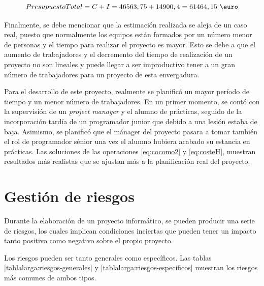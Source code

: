 \documentclass[pdftex,11pt,a4paper]{book}
\begin{document}
\vspace{-3mm}
\begin{equation}
Presupuesto Total = C + I = 46563,75 + 14900,4 = 61464,15 \textup{ \euro}
\label{eq:presupuesto-final}
\end{equation}

Finalmente, se debe mencionar que la estimación realizada se aleja de un caso real, puesto que normalmente los equipos están formados por un número menor de personas y el tiempo para realizar el proyecto es mayor. Esto se debe a que el aumento de trabajadores y el decremento del tiempo de realización de un proyecto no son lineales y puede llegar a ser improductivo tener a un gran número de trabajadores para un proyecto de esta envergadura.

Para el desarrollo de este proyecto, realmente se planificó un mayor período de tiempo y un menor número de trabajadores. En un primer momento, se contó con la supervisión de un \textit{project manager} y el alumno de prácticas, seguido de la incorporación tardía de un programador junior que debido a una lesión estaba de baja. Asimismo, se planificó que el mánager del proyecto pasara a tomar también el rol de programador sénior una vez el alumno hubiera acabado su estancia en prácticas. Las soluciones de las operaciones \ref{eq:cocomo2} y \ref{eq:costeH}, muestran resultados más realistas que se ajustan más a la planificación real del proyecto.

\section{Gestión de riesgos} \label{seccion:riesgos}

Durante la elaboración de un proyecto informático, se pueden producir una serie de riesgos, los cuales implican condiciones inciertas que pueden tener un impacto tanto positivo como negativo sobre el propio proyecto. 

Los riesgos pueden ser tanto generales como específicos. Las tablas \ref{tablalarga:riesgos-generales} y \ref{tablalarga:riesgos-especificos} muestran los riesgos más comunes de ambos tipos. 

\renewcommand{\tablename}{Tabla}

\renewcommand{\arraystretch}{1,7}
\end{document}
